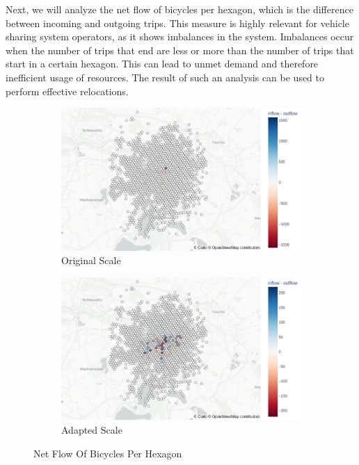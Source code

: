 Next, we will analyze the net flow of bicycles per hexagon, which is the
difference between incoming and outgoing trips. This measure is highly relevant
for vehicle sharing system operators, as it shows imbalances in the system.
Imbalances occur when the number of trips that end are less or more than the
number of trips that start in a certain hexagon. This can lead to unmet demand
and therefore inefficient usage of resources. The result of such an analysis
can be used to perform effective relocations.

\begin{figure}[htb]
    \centering
    \begin{subfigure}[b]{0.45\textwidth}
        \includegraphics[width=1\textwidth]{Figures/descriptive_analysis/net_flow_original.png}
        \caption{Original Scale}
        \label{fig:descriptive_analysis_net_flow_original}
    \end{subfigure}
    \begin{subfigure}[b]{0.45\textwidth}
        \includegraphics[width=1\textwidth]{Figures/descriptive_analysis/net_flow_rescaled.png}
        \caption{Adapted Scale}
        \label{fig:descriptive_analysis_net_flow_rescaled}
    \end{subfigure}
    \caption{Net Flow Of Bicycles Per Hexagon}
    \label{fig:descriptive_analysis_net_flow}
\end{figure}

